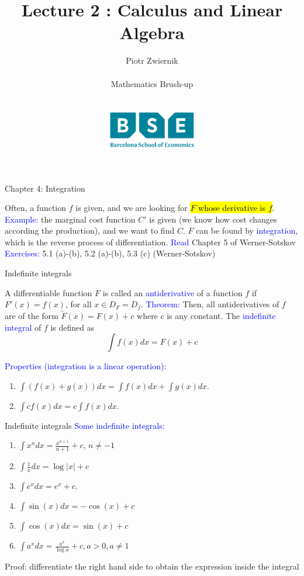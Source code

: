 \documentclass[11pt,aspectratio=169]{beamer}
\title[Calculus and Linear Algebra]{Lecture 2 : Calculus and Linear Algebra}
\author[Piotr Zwiernik, Barcelona School of Economics]{Piotr Zwiernik \\ $\;$\\
Mathematics Brush-up\\ $\;$\\ $\;$\\
\includegraphics[width=1.5in]{img/bse.png}  
}
\date{}
\begin{document}
\begin{frame}
\titlepage
\end{frame}






\begin{frame}{Chapter 4: Integration}

Often, a function $f$ is given, and we are looking for \hl{$F$ whose derivative is $f$}.
\vskip 12pt
\textcolor{blue}{Example:} the marginal cost function $C'$ is given (we know how cost changes according the production), and we want to find $C$.
\vskip 12pt
$F$ can be found by \textcolor{blue}{integration}, which is the reverse process of differentiation.
\vskip 12pt
\textcolor{blue}{Read}  Chapter 5 of Werner-Sotskov 
\vskip 12pt
\textcolor{blue}{Exercises:} 5.1 (a)-(b), 5.2 (a)-(b), 5.3 (c) (Werner-Sotskov)
\end{frame}
\begin{frame}{Indefinite integrals}

A differentiable function $F$ is called an \textcolor{blue}{antiderivative} of a function $f$ if $F'(x)=f(x)$, for all $x \in D_F=D_f$.
\vskip 12pt
\textcolor{blue}{Theorem:} Then, all antiderivatives of $f$ are of the form $\tilde{F}(x)=F(x)+c$ where $c$ is any constant.
\vskip 12pt
The \textcolor{blue}{indefinite integral} of $f$ is defined as $$\int f(x) dx=F(x)+c$$

\textcolor{blue}{Properties (integration is a linear operation):}
\begin{enumerate}
\item $\int (f(x)+g(x)) dx=\int f(x) dx+\int g(x) dx$.
\item $\int cf(x) dx= c \int f(x) dx$.
\end{enumerate}\end{frame}

\begin{frame}{Indefinite integrals}
\textcolor{blue}{Some indefinite integrals:}
\begin{enumerate}
\item $\int x^n dx =\frac{x^{n+1}}{n+1} +c$, $n \neq -1$  \\[3mm]
\item $\int \frac{1}{x} dx=\log \vert x \vert +c$ \\[3mm]
\item $\int e^x dx= e^x +c$.\\[3mm]
\item $\int \sin(x) dx=-\cos(x)+c \qquad $\\[3mm]
\item $\int \cos(x) dx=\sin(x)+c$\\[3mm]
\item $\int a^x dx=\frac{a^x}{\log a} +c, a>0, a \neq 1$\\[3mm]
\end{enumerate}
\begin{small} Proof: differentiate the right hand side to obtain the expression  inside the integral \end{small}
\end{frame}
\end{document}
